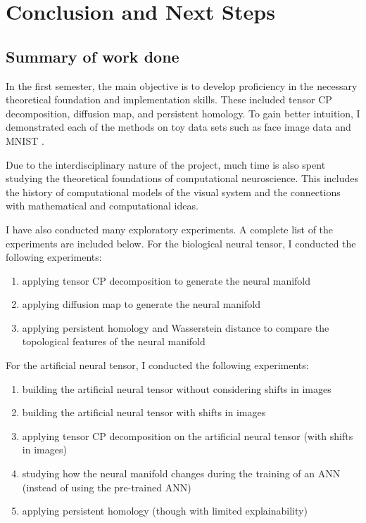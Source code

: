 \chapter{Conclusion and Next Steps} 
\label{chapter-conclusion}

\section{Summary of work done}

In the first semester, the main objective is to develop proficiency in the necessary theoretical foundation and implementation skills. These included tensor CP decomposition, diffusion map, and persistent homology. To gain better intuition, I demonstrated each of the methods on toy data sets such as face image data and MNIST \cite{mnist}. 

Due to the interdisciplinary nature of the project, much time is also spent studying the theoretical foundations of computational neuroscience. This includes the history of computational models of the visual system and the connections with mathematical and computational ideas. 

I have also conducted many exploratory experiments. A complete list of the experiments are included below.
For the biological neural tensor, I conducted the following experiments:
\begin{enumerate}
    \item applying tensor CP decomposition to generate the neural manifold
    \item applying diffusion map to generate the neural manifold
    \item applying persistent homology and Wasserstein distance to compare the topological features of the neural manifold
\end{enumerate}

For the artificial neural tensor, I conducted the following experiments:
\begin{enumerate}
    \item building the artificial neural tensor without considering shifts in images
    \item building the artificial neural tensor with shifts in images
    \item applying tensor CP decomposition on the artificial neural tensor (with shifts in images)
    \item studying how the neural manifold changes during the training of an ANN (instead of using the pre-trained ANN)
    \item applying persistent homology (though with limited explainability)
\end{enumerate}

